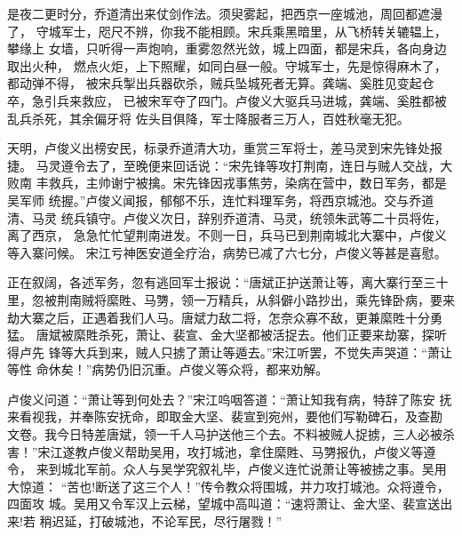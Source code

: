 是夜二更时分，乔道清出来仗剑作法。须臾雾起，把西京一座城池，周回都遮漫了，
守城军士，咫尺不辨，你我不能相顾。宋兵乘黑暗里，从飞桥转关辘辒上，攀缘上
女墙，只听得一声炮响，重雾忽然光敛，城上四面，都是宋兵，各向身边取出火种，
燃点火炬，上下照耀，如同白昼一般。守城军士，先是惊得麻木了，都动弹不得，
被宋兵掣出兵器砍杀，贼兵坠城死者无算。龚端、奚胜见变起仓卒，急引兵来救应，
已被宋军夺了四门。卢俊义大驱兵马进城，龚端、奚胜都被乱兵杀死，其余偏牙将
佐头目俱降，军士降服者三万人，百姓秋毫无犯。

天明，卢俊义出榜安民，标录乔道清大功，重赏三军将士，差马灵到宋先锋处报捷。
马灵遵令去了，至晚便来回话说：“宋先锋等攻打荆南，连日与贼人交战，大败南
丰救兵，主帅谢宁被擒。宋先锋因戎事焦劳，染病在营中，数日军务，都是吴军师
统握。”卢俊义闻报，郁郁不乐，连忙料理军务，将西京城池。交与乔道清、马灵
统兵镇守。卢俊义次日，辞别乔道清、马灵，统领朱武等二十员将佐，离了西京，
急急忙忙望荆南进发。不则一日，兵马已到荆南城北大寨中，卢俊义等入寨问候。
宋江亏神医安道全疗治，病势已减了六七分，卢俊义等甚是喜慰。

正在叙阔，各述军务，忽有逃回军士报说：“唐斌正护送萧让等，离大寨行至三十
里，忽被荆南贼将縻貹、马勥，领一万精兵，从斜僻小路抄出，乘先锋卧病，要来
劫大寨之后，正遇着我们人马。唐斌力敌二将，怎奈众寡不敌，更兼縻貹十分勇猛。
唐斌被縻貹杀死，萧让、裴宣、金大坚都被活捉去。他们正要来劫寨，探听得卢先
锋等大兵到来，贼人只掳了萧让等遁去。”宋江听罢，不觉失声哭道：“萧让等性
命休矣！”病势仍旧沉重。卢俊义等众将，都来劝解。

卢俊义问道：“萧让等到何处去？”宋江呜咽答道：“萧让知我有病，特辞了陈安
抚来看视我，并奉陈安抚命，即取金大坚、裴宣到宛州，要他们写勒碑石，及查勘
文卷。我今日特差唐斌，领一千人马护送他三个去。不料被贼人捉掳，三人必被杀
害！”宋江遂教卢俊义帮助吴用，攻打城池，拿住縻貹、马勥报仇，卢俊义等遵令，
来到城北军前。众人与吴学究叙礼毕，卢俊义连忙说萧让等被掳之事。吴用大惊道：
“苦也!断送了这三个人！”传令教众将围城，并力攻打城池。众将遵令，四面攻
城。吴用又令军汉上云梯，望城中高叫道：“速将萧让、金大坚、裴宣送出来!若
稍迟延，打破城池，不论军民，尽行屠戮！”

